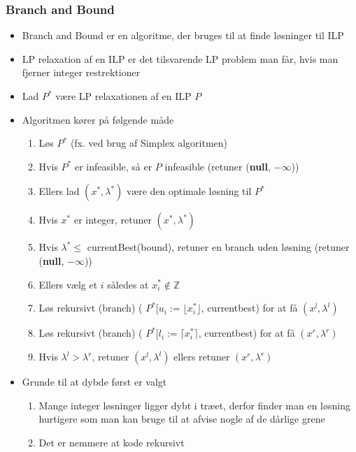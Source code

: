 \subsubsection{Branch and Bound}
\begin{itemize}
	\item Branch and Bound er en algoritme, der bruges til at finde løsninger til ILP 
  \item LP relaxation af en ILP er det tilsvarende LP problem man får, hvis man fjerner integer restrektioner
  \item Lad $P^*$ være LP relaxationen af en ILP $P$ 
  \item Algoritmen kører på følgende måde
  \begin{enumerate}
  	\item Løs $P^*$ (fx. ved brug af Simplex algoritmen)
    \item Hvis $P^*$ er infeasible, så er $P$ infeasible (retuner (\textbf{null}, $-\infty$))
    \item Ellers lad $(x^*,\lambda^*)$ være den optimale løsning til $P^*$
    \item Hvis $x^*$ er integer, retuner $(x^*,\lambda^*)$
    \item Hvis $\lambda^* \leq$ currentBest(bound), retuner en branch uden løsning (retuner (\textbf{null}, $-\infty$))
    \item Ellers vælg et $i$ således at $x_i^* \notin \mathbb Z$
    \item Løs rekursivt (branch) ( $P^*[u_i := \lfloor x_i^* \rfloor$, currentbest) for at få $(x^l, \lambda^l)$
    \item Løs rekursivt (branch) ( $P^*[l_i := \lceil x_i^* \rceil$, currentbest) for at få $(x^r, \lambda^r)$
    \item Hvis $\lambda^l > \lambda^r$, retuner $(x^l, \lambda^l)$ ellers retuner $(x^r, \lambda^r)$
  \end{enumerate}
  \item Grunde til at dybde først er valgt
  \begin{enumerate}
  	\item Mange integer løsninger ligger dybt i træet, derfor finder man en løsning hurtigere som man kan bruge til at afvise nogle af de dårlige grene
    \item Det er nemmere at kode rekursivt
  \end{enumerate}

\end{itemize}

\newpage
